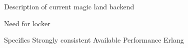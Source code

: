 Description of current magic land backend

Need for locker

Specifics
  Strongly consistent
  Available
  Performance
  Erlang
